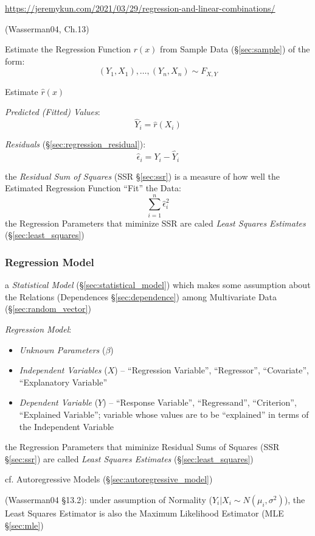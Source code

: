 \url{https://jeremykun.com/2021/03/29/regression-and-linear-combinations/}

\asterism

(Wasserman04, Ch.13)

Estimate the Regression Function $r(x)$ from Sample Data (\S\ref{sec:sample}) of
the form:
\[
  (Y_1,X_1), \ldots, (Y_n,X_n) \sim F_{X,Y}
\]

Estimate $\hat{r}(x)$

\emph{Predicted (Fitted) Values}:
\[
  \hat{Y}_i = \hat{r}(X_i)
\]

\emph{Residuals} (\S\ref{sec:regression_residual}):
\[
  \hat{\epsilon}_i = Y_i - \hat{Y}_i
\]

the \emph{Residual Sum of Squares} (SSR \S\ref{sec:ssr}) is a measure of how
well the Estimated Regression Function ``Fit'' the Data:
\[
  \sum_{i=1}^n \hat{\epsilon}_i^2
\]
the Regression Parameters that miminize SSR are caled \emph{Least Squares
  Estimates} (\S\ref{sec:least_squares})



\subsubsection{Regression Model}\label{sec:regression_model}

a \emph{Statistical Model} (\S\ref{sec:statistical_model}) which makes some
assumption about the Relations (Dependences \S\ref{sec:dependence}) among
Multivariate Data (\S\ref{sec:random_vector})

\emph{Regression Model}:
\begin{itemize}
  \item \emph{Unknown Parameters} ($\beta$)
  \item \emph{Independent Variables} ($X$) -- ``Regression Variable'',
    ``Regressor'', ``Covariate'', ``Explanatory Variable''
  \item \emph{Dependent Variable} ($Y$) -- ``Response Variable'',
    ``Regressand'', ``Criterion'', ``Explained Variable''; variable whose values
    are to be ``explained'' in terms of the Independent Variable
\end{itemize}

the Regression Parameters that miminize Residual Sums of Squares (SSR
\S\ref{sec:ssr}) are called \emph{Least Squares Estimates}
(\S\ref{sec:least_squares})

cf. Autoregressive Models (\S\ref{sec:autoregressive_model})

(Wasserman04 \S13.2):
 under assumption of Normality ($Y_i | X_i \sim N(\mu_i, \sigma^2)$), the Least
 Squares Estimator is also the Maximum Likelihood Estimator (MLE
 \S\ref{sec:mle})

